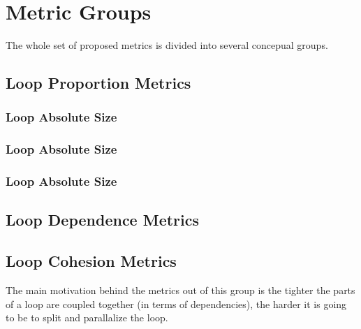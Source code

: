 \section{Metric Groups}
\label{metrics-metric-groups}

\qquad The whole set of proposed metrics is divided into several concepual groups. 

\subsection{Loop Proportion Metrics}
\subsubsection{Loop Absolute Size}
\subsubsection{Loop Absolute Size}
\subsubsection{Loop Absolute Size}

\subsection{Loop Dependence Metrics}

\subsection{Loop Cohesion Metrics}
\qquad The main motivation behind the metrics out of this group is the tighter the parts of a loop are coupled together (in terms of dependencies), the harder it is going to be to split and parallalize the loop.   


